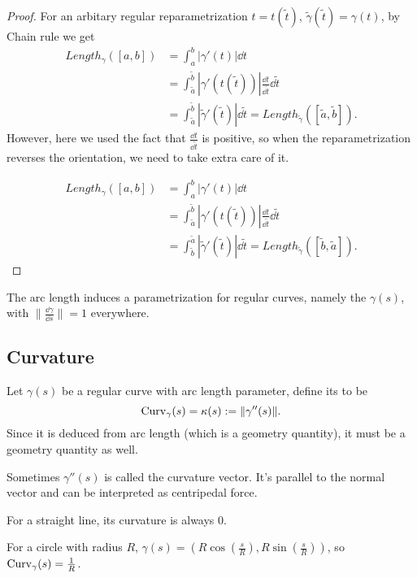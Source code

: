 \begin{proof}[Proof]
    For an arbitary regular reparametrization $t = t(\tilde{t})$,
	$\tilde{\gamma}(\tilde{t}) = \gamma(t)$,
	by Chain rule we get
	\begin{align*}
		Length_{\gamma}([a,b]) &= \int _a^b |\gamma'(t)| \dd t\\
		&= \int_{\tilde{a}}^{\tilde{b}} |\gamma'(t(\tilde{t}))|
		\frac{\dd t}{\dd \tilde{t}} \dd \tilde{t}\\
		&=\int_{\tilde{a}}^{\tilde{b}} |\tilde\gamma'(\tilde t)| \dd \tilde{t}
		= Length_{\tilde{\gamma}}([\tilde a,\tilde b]).
	\end{align*}
	However, here we used the fact that $\frac{\dd t}{\dd \tilde t}$
	is positive, so when the reparametrization reverses the orientation,
	we need to take extra care of it.

	\begin{align*}
		Length_{\gamma}([a,b]) &= \int _a^b |\gamma'(t)| \dd t\\
		&= \int_{\tilde{a}}^{\tilde{b}} |\gamma'(t(\tilde{t}))|
		\frac{\dd t}{\dd \tilde{t}} \dd \tilde{t}\\
		&=\int^{\tilde{a}}_{\tilde{b}} |\tilde\gamma'(\tilde t)| \dd \tilde{t}
		= Length_{\tilde{\gamma}}([\tilde b, \tilde a]).
	\end{align*}
\end{proof}

The arc length induces a parametrization for regular curves, namely the
 $\gamma(s)$, with $\lVert \frac{\dd\gamma}{\dd s}\rVert = 1$
everywhere.

\subsection{Curvature}
\label{sub:Curvature}
\begin{definition}[Curvature]
	Let $\gamma(s)$ be a regular curve with arc length parameter,
	define its  to be
	\[
	\operatorname{Curv}_\gamma(s) = \kappa(s) := \lVert \gamma''(s)\rVert.
	\]
	Since it is deduced from arc length (which is a geometry quantity), it
	must be a geometry quantity as well.
\end{definition}
\begin{remark}
    Sometimes $\gamma''(s)$ is called the curvature vector.
	It's parallel to the normal vector and can be interpreted as
	centripedal force.
\end{remark}

\begin{example}
    For a straight line, its curvature is always $0$.

	For a circle with radius $R$,
	$\gamma(s)=(R\cos(\frac{s}{R}), R\sin(\frac{s}{R}))$,
	so $\operatorname{Curv}_\gamma(s) = \frac{1}{R}$.
\end{example}

